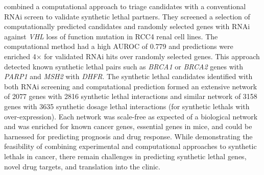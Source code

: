 \citet{Jerby2014} combined a computational approach to triage candidates with a conventional \gls{RNAi} screen to validate \gls{synthetic lethal} partners. They screened a selection of computationally predicted candidates and randomly selected genes with \gls{RNAi} against \textit{VHL} loss of function mutation in RCC4 renal cell lines. The computational method had a high \gls{AUROC} of 0.779 and predictions were enriched 4$\times$ for validated \gls{RNAi} hits over randomly selected genes. This approach detected known \gls{synthetic lethal} pairs such as \textit{BRCA1} or \textit{BRCA2} genes with \textit{PARP1} and \textit{MSH2} with \textit{DHFR}. The \gls{synthetic lethal} candidates identified with both \gls{RNAi} screening and computational prediction formed an extensive network of 2077 genes with 2816 \gls{synthetic lethal} interactions and similar network of 3158 genes with 3635 synthetic dosage lethal interactions (for \glspl{synthetic lethal} with over-expression). Each network was scale-free as expected of a biological network and was enriched for known cancer genes, essential genes in mice, and could be harnessed for predicting prognosis and drug response. While demonstrating the feasibility of combining experimental and computational approaches to \glspl{synthetic lethal} in cancer, there remain challenges in predicting \gls{synthetic lethal} genes, novel drug targets, and translation into the clinic.  

